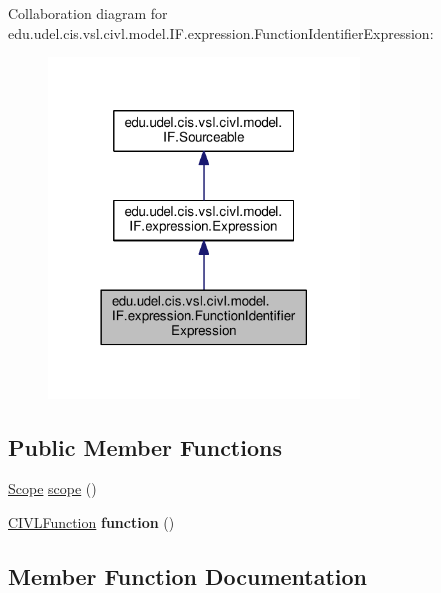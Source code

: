 Collaboration diagram for edu.\+udel.\+cis.\+vsl.\+civl.\+model.\+I\+F.\+expression.\+Function\+Identifier\+Expression\+:
\nopagebreak
\begin{figure}[H]
\begin{center}
\leavevmode
\includegraphics[width=234pt]{interfaceedu_1_1udel_1_1cis_1_1vsl_1_1civl_1_1model_1_1IF_1_1expression_1_1FunctionIdentifierExpression__coll__graph}
\end{center}
\end{figure}
\subsection*{Public Member Functions}
\begin{DoxyCompactItemize}
\item 
\hyperlink{interfaceedu_1_1udel_1_1cis_1_1vsl_1_1civl_1_1model_1_1IF_1_1Scope}{Scope} \hyperlink{interfaceedu_1_1udel_1_1cis_1_1vsl_1_1civl_1_1model_1_1IF_1_1expression_1_1FunctionIdentifierExpression_aa8ecc14c9933e1dd2393a57f00f4906f}{scope} ()
\item 
\hypertarget{interfaceedu_1_1udel_1_1cis_1_1vsl_1_1civl_1_1model_1_1IF_1_1expression_1_1FunctionIdentifierExpression_a167dd6b05e035dbc4c9e13c729bc9d0e}{}\hyperlink{interfaceedu_1_1udel_1_1cis_1_1vsl_1_1civl_1_1model_1_1IF_1_1CIVLFunction}{C\+I\+V\+L\+Function} {\bfseries function} ()\label{interfaceedu_1_1udel_1_1cis_1_1vsl_1_1civl_1_1model_1_1IF_1_1expression_1_1FunctionIdentifierExpression_a167dd6b05e035dbc4c9e13c729bc9d0e}

\end{DoxyCompactItemize}


\subsection{Member Function Documentation}
\hypertarget{interfaceedu_1_1udel_1_1cis_1_1vsl_1_1civl_1_1model_1_1IF_1_1expression_1_1FunctionIdentifierExpression_aa8ecc14c9933e1dd2393a57f00f4906f}{}
